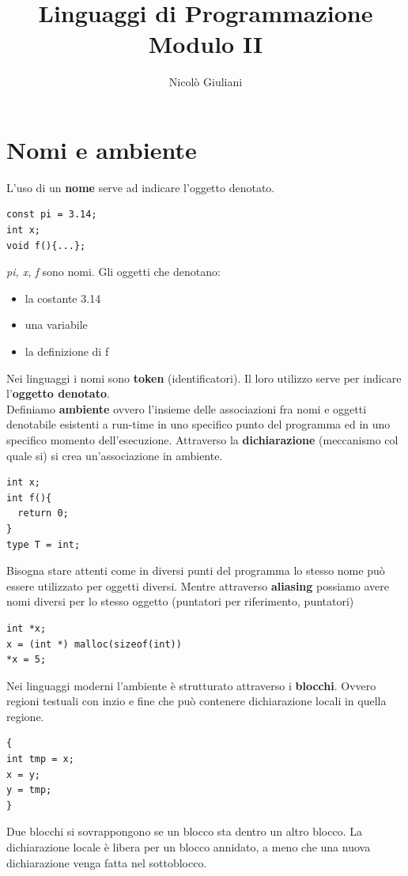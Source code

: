 \documentclass[a4paper,12pt]{article}
\title{Linguaggi di Programmazione\\
\large Modulo II}
\author{Nicolò Giuliani}
\date{}
\begin{document}
\maketitle
\tableofcontents   %
\newpage 

\section{Nomi e ambiente}
L'uso di un \textbf{nome} serve ad indicare l’oggetto denotato.
\begin{lstlisting}
const pi = 3.14;
int x;
void f(){...};
\end{lstlisting}
\textit{pi, x, f} sono nomi. Gli oggetti che denotano:
\begin{itemize}
  \item la costante 3.14
  \item una variabile
  \item la definizione di f 
\end{itemize}
Nei linguaggi i nomi sono \textbf{token} (identificatori). Il loro utilizzo serve per indicare l'\textbf{oggetto denotato}.\\
Definiamo \textbf{ambiente} ovvero l'insieme delle associazioni fra nomi e oggetti denotabile esistenti a run-time in uno specifico punto del programma ed in uno specifico momento dell’esecuzione.
Attraverso la \textbf{dichiarazione} (meccanismo col quale si) si crea un'associazione in ambiente.
\begin{lstlisting}
int x;
int f(){
  return 0;
}
type T = int;
\end{lstlisting}
Bisogna stare attenti come in diversi punti del programma lo stesso nome può essere utilizzato per oggetti diversi. Mentre attraverso \textbf{aliasing} possiamo avere nomi diversi per lo stesso oggetto (puntatori per riferimento, puntatori)
\begin{lstlisting}
int *x;
x = (int *) malloc(sizeof(int))
*x = 5;
\end{lstlisting}
Nei linguaggi moderni l'ambiente è strutturato attraverso i \textbf{blocchi}. Ovvero regioni testuali con inzio e fine che può contenere dichiarazione locali in quella regione.
\begin{lstlisting}
{
int tmp = x;
x = y;
y = tmp;
}
\end{lstlisting}
Due blocchi si sovrappongono se un blocco sta dentro un altro blocco. La dichiarazione locale è libera per un blocco annidato, a meno che una nuova dichiarazione venga fatta nel sottoblocco. \\
\end{document}

